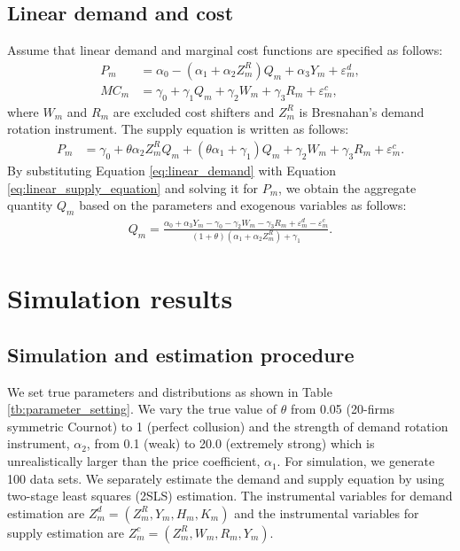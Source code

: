 \documentclass[11pt, a4paper]{article}
\begin{document}
\subsection{Linear demand and cost}
Assume that linear demand and marginal cost functions are specified as follows:
\begin{align}
    P_m &= \alpha_0 - (\alpha_1 + \alpha_2Z^{R}_{m})Q_{m} + \alpha_3 Y_m + \varepsilon^{d}_{m},\label{eq:linear_demand}\\
    MC_m &= \gamma_0  + \gamma_1 Q_{m} + \gamma_2 W_{m} + \gamma_3 R_{m} + \varepsilon^{c}_{m},\label{eq:linear_marginal_cost}
\end{align}
where $W_{m}$ and $R_{m}$ are excluded cost shifters and $Z^{R}_{m}$ is Bresnahan's demand rotation instrument. 
The supply equation is written as follows:
\begin{align}
    P_m 
    &= \gamma_0 + \theta \alpha_2 Z^{R}_mQ_{m} + (\theta\alpha_1 + \gamma_1) Q_{m} + \gamma_2 W_m + \gamma_3 R_{m} +\varepsilon^c_m.\label{eq:linear_supply_equation}
\end{align}
By substituting Equation \eqref{eq:linear_demand} with Equation \eqref{eq:linear_supply_equation} and solving it for $P_m$, we obtain the aggregate quantity $Q_{m}$ based on the parameters and exogenous variables as follows:
\begin{align}
    Q_{m} =  \frac{\alpha_0 + \alpha_3 Y_m - \gamma_0 - \gamma_2 W_{m} - \gamma_3 R_{m} + \varepsilon^{d}_{m} - \varepsilon^{c}_{m}}{(1 + \theta) (\alpha_1 + \alpha_2 Z^{R}_{m}) + \gamma_1}.\label{eq:quantity_linear}
\end{align}


\section{Simulation results}\label{sec:results}

\subsection{Simulation and estimation procedure}

We set true parameters and distributions as shown in Table \ref{tb:parameter_setting}. 
We vary the true value of $\theta$ from 0.05 (20-firms symmetric Cournot) to 1 (perfect collusion) and the strength of demand rotation instrument, $\alpha_2$, from 0.1 (weak) to 20.0 (extremely strong) which is unrealistically larger than the price coefficient, $\alpha_1$.
For simulation, we generate 100 data sets.
We separately estimate the demand and supply equation by using two-stage least squares (2SLS) estimation.
The instrumental variables for demand estimation are $Z^{d}_{m} = (Z^{R}_{m}, Y_m, H_{m}, K_{m})$ and the instrumental variables for supply estimation are $Z^{c}_{m} = (Z^{R}_{m}, W_{m}, R_{m}, Y_m)$. 
\end{document}
